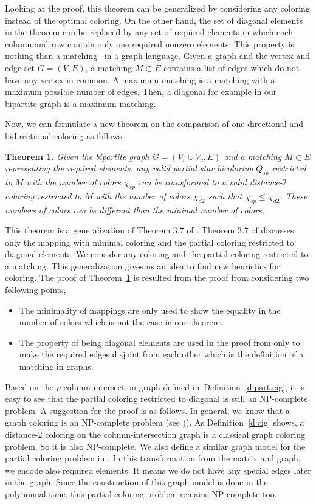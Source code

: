 \documentclass[12pt, twoside,a4paper,toc=bibliography]{scrbook}
\newtheorem{theorem}{Theorem}
\newcommand{\defref}[1]{Definition~\protect\ref{#1}}
\newcommand{\sparsifysymbol}{\ensuremath{\rho}}
\begin{document}
Looking at the proof, this theorem can be generalized by considering any
coloring instead of the optimal coloring.
On the other hand, the set of diagonal elements in the theorem
can be replaced by any set of required elements
in which each column and row contain only one required nonzero elements.
This property is nothing than a matching~\cite{bondy2008graph} in a graph language.
Given a graph and the vertex and edge set $G=(V,E)$, a matching $M\subset E$ contains
a list of edges which do not have any vertex in common.
A maximum matching is a matching with a maximum possible number of edges.
Then, a diagonal for example in our bipartite graph is a maximum matching.

Now, we can formulate a new theorem on the comparison of one directional and
bidirectional coloring as follows,
\begin{theorem}
\label{t.matching}
Given the bipartite graph $G=(V_r\cup V_c,E)$ and a matching $M\subset E$ representing
the required elements, any valid partial star bicoloring $Q_{sp}$ restricted to $M$
with the number of colors $\chi_{sp}$
can be transformed to a valid distance-$2$ coloring restricted to $M$
with the number of colors $\chi_{d2}$ such that $\chi_{sp} \leq \chi_{d2}$.
These numbers of colors can be different than the minimal number of colors.
\end{theorem}
This theorem is a generalization of Theorem 3.7 of \cite{Lulfesmann2012Fap}.
Theorem 3.7 of \cite{Lulfesmann2012Fap} discusses only the mapping with minimal coloring
and the partial coloring restricted to diagonal elements. We consider any coloring
and the partial coloring restricted to a matching. This generalization gives us an idea
to find new heuristics for coloring. The proof of Theorem~\ref{t.matching}
is resulted from the proof from \cite{Lulfesmann2012Fap} considering two following points,
\begin{itemize}
\item The minimality of mappings are only used to show the equality in the number of colors which is not
the case in our theorem.
\item The property of being diagonal elements are used in the proof from \cite{Lulfesmann2012Fap} only to
make the required edges disjoint from each other which is the definition of a matching in graphs.
\end{itemize}


Based on the $\sparsifysymbol$-column intersection graph defined in~\defref{d.part.cig},
it is easy to see
that the partial coloring restricted to diagonal is still an NP-complete problem.
A suggestion for the proof is as follows.
In general, we know that a graph coloring is an NP-complete problem
(see \cite{np-complet-graph-coloring})).
As \defref{d:cig} shows, a distance-2 coloring on the column-intersection graph
is a classical graph coloring problem. So it is also NP-complete.
We also define a similar graph model for the partial coloring problem in
\cite{2016:01}. In this transformation from the matrix and graph, we encode also 
required elements. It means we do not have any special
edges later in the graph.
Since the construction of this graph model is done in
the polynomial time, this partial coloring problem remains NP-complete too.
\end{document}
